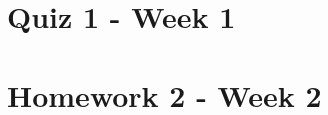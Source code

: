 \documentclass{homework}
\begin{document}
\begin{tcolorbox}[title=Question 16]
\end{tcolorbox}

\begin{tcolorbox}[title=Question 17]
\end{tcolorbox}

\begin{tcolorbox}[title=Question 18]
\end{tcolorbox}

\begin{tcolorbox}[title=Question 19]
\end{tcolorbox}

\begin{tcolorbox}[title=Question 20]
\end{tcolorbox}

\clearpage

\section{Quiz 1 - Week 1}

\begin{tcolorbox}[title=Question 1]
\end{tcolorbox}

\clearpage

\section{Homework 2 - Week 2}

\begin{tcolorbox}[title=Question 1]
\end{tcolorbox}

\clearpage
\end{document}
